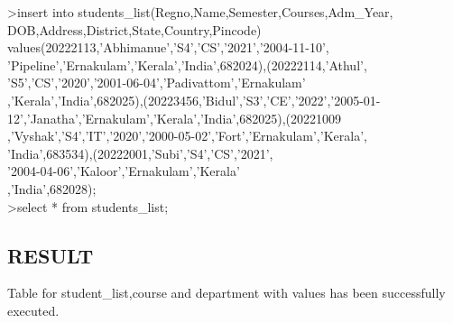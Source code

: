\documentclass{article}
\begin{document}
\begin{flushleft}
\vspace{0.1in}\hspace{0.3in}\textgreater insert into students\_list(Regno,Name,Semester,Courses,Adm\_Year,\\ \vspace{0.1in}\hspace{0.4in} DOB,Address,District,State,Country,Pincode) \\  \vspace{0.1in}\hspace{0.4in} values(20222113,'Abhimanue','S4','CS','2021','2004-11-10', \\ \vspace{0.1in}\hspace{0.4in} 'Pipeline','Ernakulam','Kerala','India',682024),(20222114,'Athul',\\ \vspace{0.1in}\hspace{0.4in}'S5','CS','2020','2001-06-04','Padivattom','Ernakulam'\\ \vspace{0.1in}\hspace{0.4in},'Kerala','India',682025),(20223456,'Bidul','S3','CE','2022','2005-01-\\ \vspace{0.1in}\hspace{0.4in}12','Janatha','Ernakulam','Kerala','India',682025),(20221009\\ \vspace{0.1in}\hspace{0.4in},'Vyshak','S4','IT','2020','2000-05-02','Fort','Ernakulam','Kerala',\\ \vspace{0.1in}\hspace{0.4in}'India',683534),(20222001,'Subi','S4','CS','2021',\\ \vspace{0.1in}\hspace{0.4in}'2004-04-06','Kaloor','Ernakulam','Kerala'\\ \vspace{0.1in}\hspace{0.4in},'India',682028);\\
\vspace{0.1in}\hspace{0.4in}\textgreater select * from students\_list;\\
\vspace{0.4in}\hspace{0.4in}
\subsection{RESULT}
Table for student\_list,course and department with values has been successfully executed.
\end{flushleft}
\end{document}
